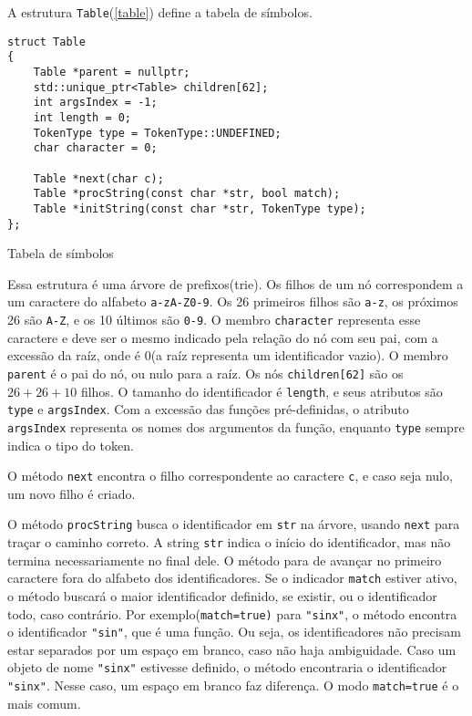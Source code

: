 \documentclass[10pt,a4paper]{article}
\newenvironment{code}{\captionsetup{type=listing}}{}
\begin{document}
A estrutura \texttt{Table}(\ref{table}) define a tabela de símbolos.

\begin{code}
\begin{verbatim}
struct Table
{
    Table *parent = nullptr;
    std::unique_ptr<Table> children[62];
    int argsIndex = -1;
    int length = 0;
    TokenType type = TokenType::UNDEFINED;
    char character = 0;

    Table *next(char c);
    Table *procString(const char *str, bool match);
    Table *initString(const char *str, TokenType type);
};
\end{verbatim}
\caption{Tabela de símbolos}
\label{table}
\end{code}

Essa estrutura é uma árvore de prefixos(trie).
Os filhos de um nó correspondem a um caractere do alfabeto \texttt{a-zA-Z0-9}.
Os 26 primeiros filhos são \texttt{a-z}, os próximos 26 são \texttt{A-Z}, e os 10 últimos são \texttt{0-9}.
O membro \texttt{character} representa esse caractere e deve ser o mesmo indicado pela relação do nó com seu pai,
com a excessão da raíz, onde é 0(a raíz representa um identificador vazio).
O membro \texttt{parent} é o pai do nó, ou nulo para a raíz.
Os nós \texttt{children[62]} são os $26+26+10$ filhos.
O tamanho do identificador é \texttt{length}, e seus atributos são \texttt{type} e \texttt{argsIndex}.
Com a excessão das funções pré-definidas, o atributo \texttt{argsIndex} representa os nomes dos argumentos da função,
enquanto \texttt{type} sempre indica o tipo do token.

O método \texttt{next} encontra o filho correspondente ao caractere \texttt{c}, e caso seja nulo,
um novo filho é criado.

O método \texttt{procString} busca o identificador em \texttt{str} na árvore,
usando \texttt{next} para traçar o caminho correto.
A string \texttt{str} indica o início do identificador, mas não termina necessariamente no final dele.
O método para de avançar no primeiro caractere fora do alfabeto dos identificadores.
Se o indicador \texttt{match} estiver ativo, o método buscará o maior identificador definido,
se existir, ou o identificador todo, caso contrário.
Por exemplo(\texttt{match=true)} para \texttt{"sinx"}, o método encontra o identificador \texttt{"sin"},
que é uma função. Ou seja, os identificadores não precisam estar separados por um espaço em branco,
caso não haja ambiguidade.
Caso um objeto de nome \texttt{"sinx"} estivesse definido,
o método encontraria o identificador \texttt{"sinx"}.
Nesse caso, um espaço em branco faz diferença. O modo \texttt{match=true} é o mais comum.
\end{document}

